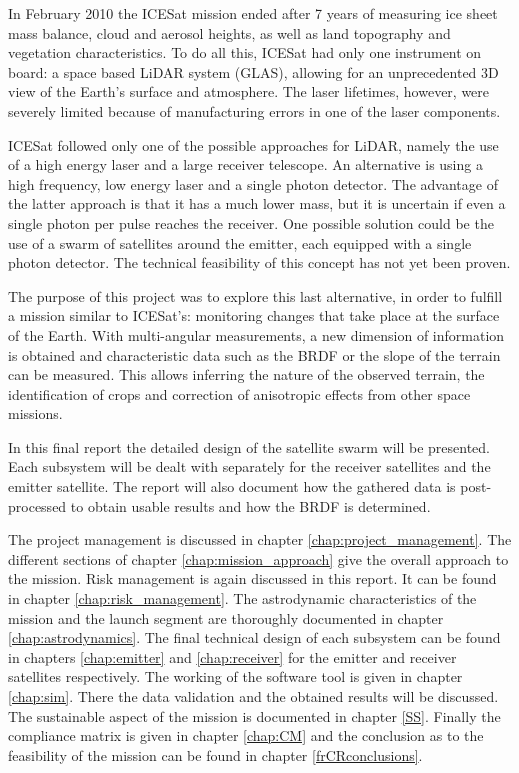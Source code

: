 In February 2010 the ICESat mission ended after 7 years of measuring ice sheet mass balance, cloud and aerosol heights, as well as land topography and vegetation characteristics.
To do all this, ICESat had only one instrument on board: a space based \ac{LiDAR} system (\ac{GLAS}), allowing for an unprecedented 3D view of the Earth's surface and atmosphere.
The laser lifetimes, however, were severely limited because of manufacturing errors in one of the laser components.

ICESat followed only one of the possible approaches for \ac{LiDAR}, namely the use of a high energy laser and a large receiver telescope. An alternative is using a high frequency, low energy laser and a single photon detector. The advantage of the latter approach is that it has a much lower mass, but it is uncertain if even a single photon per pulse reaches the receiver. One possible solution could be the use of a swarm of satellites around the emitter, each equipped with a single photon detector. The technical feasibility of this concept has not yet been proven.

The purpose of this project was to explore this last alternative, in order to fulfill a mission similar to ICESat's: monitoring changes that take place at the surface of the Earth. With multi-angular measurements, a new dimension of information is obtained and characteristic data such as the \acs{BRDF} or the slope of the terrain can be measured. This allows inferring the nature of the observed terrain, the identification of crops and correction of anisotropic effects from other space missions.

In this final report the detailed design of the satellite swarm will be presented. Each subsystem will be dealt with separately for the receiver satellites and the emitter satellite. The report will also document how the gathered data is post-processed to obtain usable results and how the \acs{BRDF} is determined.

The project management is discussed in chapter \ref{chap:project_management}. The different sections of chapter \ref{chap:mission_approach} give the overall approach to the mission. Risk management is again discussed in this report. It can be found in chapter \ref{chap:risk_management}. The astrodynamic characteristics of the mission and the launch segment are thoroughly documented in chapter \ref{chap:astrodynamics}. The final technical design of each subsystem can be found in chapters \ref{chap:emitter} and \ref{chap:receiver} for the emitter and receiver satellites respectively.
The working of the software tool is given in chapter \ref{chap:sim}. There the data validation and the obtained results will be discussed. The sustainable aspect of the mission is documented in chapter \ref{SS}. 
Finally the compliance matrix is given in chapter \ref{chap:CM} and the conclusion as to the feasibility of the mission can be found in chapter \ref{frCRconclusions}.

